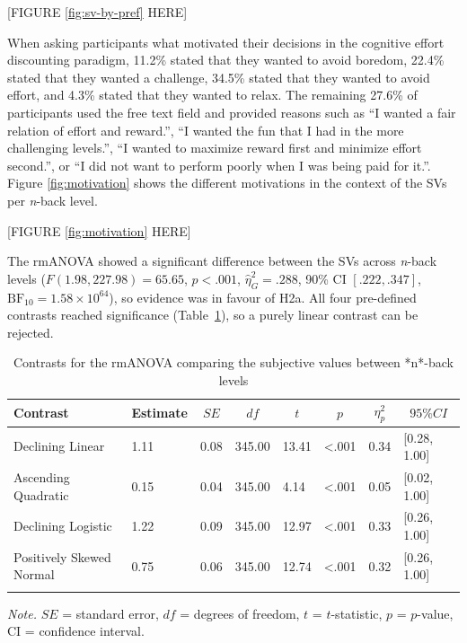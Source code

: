 \documentclass[
  man,floatsintext]{apa6}
\begin{document}
{[}FIGURE \ref{fig:sv-by-pref} HERE{]}

When asking participants what motivated their decisions in the cognitive effort discounting paradigm, 11.2\% stated that they wanted to avoid boredom, 22.4\% stated that they wanted a challenge, 34.5\% stated that they wanted to avoid effort, and 4.3\% stated that they wanted to relax.
The remaining 27.6\% of participants used the free text field and provided reasons such as ``I wanted a fair relation of effort and reward.'', ``I wanted the fun that I had in the more challenging levels.'', ``I wanted to maximize reward first and minimize effort second.'', or ``I did not want to perform poorly when I was being paid for it.''.
Figure \ref{fig:motivation} shows the different motivations in the context of the SVs per \emph{n}-back level.

{[}FIGURE \ref{fig:motivation} HERE{]}

The rmANOVA showed a significant difference between the SVs across \emph{n}-back levels (\(F(1.98, 227.98) = 65.65\), \(p < .001\), \(\hat{\eta}^2_G = .288\), 90\% CI \([.222, .347]\), \(\mathrm{BF}_{\textrm{10}} = 1.58 \times 10^{64}\)), so evidence was in favour of H2a.
All four pre-defined contrasts reached significance (Table~\ref{tab:H2a-contrasts}), so a purely linear contrast can be rejected.

\begin{table}[H]

\begin{center}
\begin{threeparttable}

\caption{\label{tab:H2a-contrasts}Contrasts for the rmANOVA comparing the subjective values between *n*-back levels}

\begin{tabular}{llllllll}
\toprule
Contrast & \multicolumn{1}{c}{Estimate} & \multicolumn{1}{c}{$SE$} & \multicolumn{1}{c}{$df$} & \multicolumn{1}{c}{$t$} & \multicolumn{1}{c}{$p$} & \multicolumn{1}{c}{$\eta_{p}^{2}$} & \multicolumn{1}{c}{$95\% CI$}\\
\midrule
Declining Linear & 1.11 & 0.08 & 345.00 & 13.41 & <.001 & 0.34 & {}[0.28, 1.00]\\
Ascending Quadratic & 0.15 & 0.04 & 345.00 & 4.14 & <.001 & 0.05 & {}[0.02, 1.00]\\
Declining Logistic & 1.22 & 0.09 & 345.00 & 12.97 & <.001 & 0.33 & {}[0.26, 1.00]\\
Positively Skewed Normal & 0.75 & 0.06 & 345.00 & 12.74 & <.001 & 0.32 & {}[0.26, 1.00]\\
\bottomrule
\addlinespace
\end{tabular}

\begin{tablenotes}[para]
\normalsize{\textit{Note.} $SE$ = standard error, $df$ = degrees of freedom, $t$ = $t$-statistic, $p$ = $p$-value, CI = confidence interval.}
\end{tablenotes}

\end{threeparttable}
\end{center}

\end{table}
\end{document}
